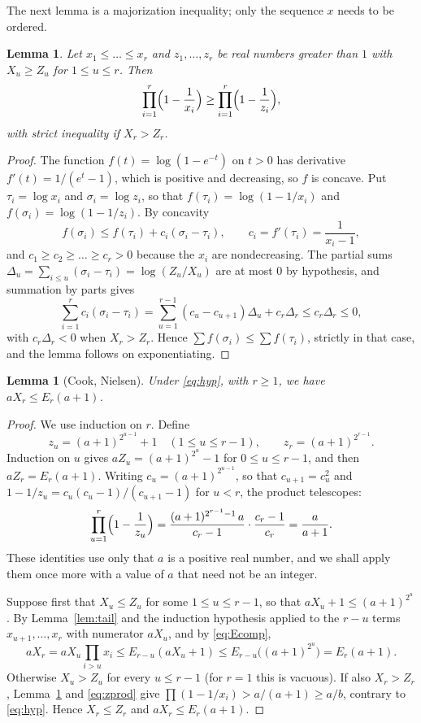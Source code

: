 \documentclass[11pt,reqno]{amsart}
\numberwithin{equation}{section}
\theoremstyle{plain}
\newtheorem{lemma}[theorem]{Lemma}
\theoremstyle{definition}
\theoremstyle{remark}
\begin{document}
The next lemma is a majorization inequality; only the sequence $x$
needs to be ordered.

\begin{lemma}\label{lem:major}
Let $x_1\le\dots\le x_r$ and $z_1,\dots,z_r$ be real numbers greater
than $1$ with $X_u\ge Z_u$ for $1\le u\le r$. Then
\[
  \prod_{i=1}^{r}\Bigl(1-\frac1{x_i}\Bigr)\ge
  \prod_{i=1}^{r}\Bigl(1-\frac1{z_i}\Bigr),
\]
with strict inequality if $X_r>Z_r$.
\end{lemma}

\begin{proof}
The function $f(t)=\log(1-e^{-t})$ on $t>0$ has derivative
$f'(t)=1/(e^t-1)$, which is positive and decreasing, so $f$ is
concave. Put $\tau_i=\log x_i$ and $\sigma_i=\log z_i$, so that
$f(\tau_i)=\log(1-1/x_i)$ and $f(\sigma_i)=\log(1-1/z_i)$. By
concavity
\[
  f(\sigma_i)\le f(\tau_i)+c_i(\sigma_i-\tau_i),\qquad
  c_i=f'(\tau_i)=\frac1{x_i-1},
\]
and $c_1\ge c_2\ge\dots\ge c_r>0$ because the $x_i$ are
nondecreasing. The partial sums
$\Delta_u=\sum_{i\le u}(\sigma_i-\tau_i)=\log(Z_u/X_u)$ are at most
$0$ by hypothesis, and summation by parts gives
\[
  \sum_{i=1}^{r}c_i(\sigma_i-\tau_i)
  =\sum_{u=1}^{r-1}(c_u-c_{u+1})\Delta_u+c_r\Delta_r
  \le c_r\Delta_r\le0 ,
\]
with $c_r\Delta_r<0$ when $X_r>Z_r$. Hence
$\sum f(\sigma_i)\le\sum f(\tau_i)$, strictly in that case, and the
lemma follows on exponentiating.
\end{proof}

\begin{lemma}[Cook, Nielsen]\label{lem:cn}
Under \eqref{eq:hyp}, with $r\ge1$, we have $aX_r\le E_r(a+1)$.
\end{lemma}

\begin{proof}
We use induction on $r$. Define
\[
  z_u=(a+1)^{2^{u-1}}+1\quad(1\le u\le r-1),\qquad
  z_r=(a+1)^{2^{r-1}} .
\]
Induction on $u$ gives $aZ_u=(a+1)^{2^u}-1$ for $0\le u\le r-1$, and
then $aZ_r=E_r(a+1)$. Writing $c_u=(a+1)^{2^{u-1}}$, so that
$c_{u+1}=c_u^2$ and $1-1/z_u=c_u(c_u-1)/(c_{u+1}-1)$ for $u<r$, the
product telescopes:
\begin{equation}\label{eq:zprod}
  \prod_{u=1}^{r}\Bigl(1-\frac1{z_u}\Bigr)
  =\frac{(a+1)^{2^{r-1}-1}\,a}{c_r-1}\cdot\frac{c_r-1}{c_r}
  =\frac a{a+1} .
\end{equation}
These identities use only that $a$ is a positive real number, and we
shall apply them once more with a value of $a$ that need not be an
integer.

Suppose first that $X_u\le Z_u$ for some $1\le u\le r-1$, so that
$aX_u+1\le(a+1)^{2^u}$. By Lemma~\ref{lem:tail} and the induction
hypothesis applied to the $r-u$ terms $x_{u+1},\dots,x_r$ with
numerator $aX_u$, and by \eqref{eq:Ecomp},
\[
  aX_r=aX_u\prod_{i>u}x_i\le E_{r-u}(aX_u+1)
  \le E_{r-u}\bigl((a+1)^{2^u}\bigr)=E_r(a+1).
\]
Otherwise $X_u>Z_u$ for every $u\le r-1$ (for $r=1$ this is vacuous).
If also $X_r>Z_r$, Lemma~\ref{lem:major} and \eqref{eq:zprod} give
$\prod(1-1/x_i)>a/(a+1)\ge a/b$, contrary to \eqref{eq:hyp}. Hence
$X_r\le Z_r$ and $aX_r\le E_r(a+1)$.
\end{proof}
\end{document}

